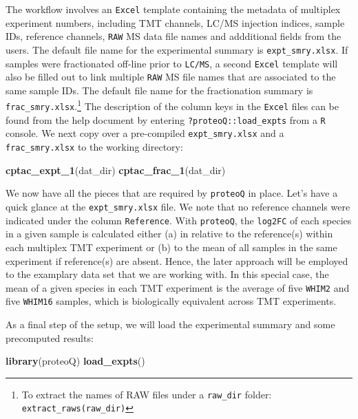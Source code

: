 \documentclass[]{article}
\newenvironment{Shaded}{\begin{snugshade}}{\end{snugshade}}
\newcommand{\KeywordTok}[1]{\textcolor[rgb]{0.13,0.29,0.53}{\textbf{#1}}}
\newcommand{\NormalTok}[1]{#1}
\let\rmarkdownfootnote\footnote%
\def\footnote{\protect\rmarkdownfootnote}
\begin{document}
The workflow involves an \texttt{Excel} template containing the metadata
of multiplex experiment numbers, including TMT channels, LC/MS injection
indices, sample IDs, reference channels, \texttt{RAW} MS data file names
and addditional fields from the users. The default file name for the
experimental summary is \texttt{expt\_smry.xlsx}. If samples were
fractionated off-line prior to \texttt{LC/MS}, a second \texttt{Excel}
template will also be filled out to link multiple \texttt{RAW} MS file
names that are associated to the same sample IDs. The default file name
for the fractionation summary is \texttt{frac\_smry.xlsx}.\footnote{To
  extract the names of RAW files under a \texttt{raw\_dir} folder:
  \texttt{extract\_raws(raw\_dir)}} The description of the column keys
in the \texttt{Excel} files can be found from the help document by
entering \texttt{?proteoQ::load\_expts} from a \texttt{R} console. We
next copy over a pre-compiled \texttt{expt\_smry.xlsx} and a
\texttt{frac\_smry.xlsx} to the working directory:

\begin{Shaded}
\begin{Highlighting}[]
\KeywordTok{cptac_expt_1}\NormalTok{(dat_dir)}
\KeywordTok{cptac_frac_1}\NormalTok{(dat_dir)}
\end{Highlighting}
\end{Shaded}

We now have all the pieces that are required by \texttt{proteoQ} in
place. Let's have a quick glance at the \texttt{expt\_smry.xlsx} file.
We note that no reference channels were indicated under the column
\texttt{Reference}. With \texttt{proteoQ}, the \texttt{log2FC} of each
species in a given sample is calculated either (a) in relative to the
reference(s) within each multiplex TMT experiment or (b) to the mean of
all samples in the same experiment if reference(s) are absent. Hence,
the later approach will be employed to the examplary data set that we
are working with. In this special case, the mean of a given species in
each TMT experiment is the average of five \texttt{WHIM2} and five
\texttt{WHIM16} samples, which is biologically equivalent across TMT
experiments.

As a final step of the setup, we will load the experimental summary and
some precomputed results:

\begin{Shaded}
\begin{Highlighting}[]
\KeywordTok{library}\NormalTok{(proteoQ)}
\KeywordTok{load_expts}\NormalTok{()}
\end{Highlighting}
\end{Shaded}
\end{document}
